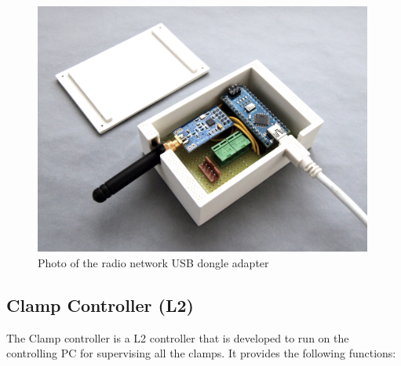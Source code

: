 \begin{figure}[h]
    \centering
    \includegraphics[width=0.99\textwidth]{images/05/image12.jpg}
    \caption{Photo of the radio network USB dongle adapter}
    \label{fig:photo-radio-network-usb-dongle-adapter}
\end{figure}

\FloatBarrier

\subsection{Clamp Controller (L2)}
\label{subsection:exploration-2-clamp-controller-l2}

The Clamp controller is a L2 controller that is developed to run on the controlling PC for supervising all the clamps. It provides the following functions:

